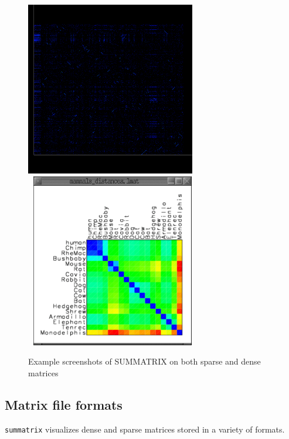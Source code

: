 \documentclass[12pt]{article}
\newcommand{\code}[1]{{\tt #1}}
\begin{document}
\begin{figure}
\begin{center}
\includegraphics[height=3in]{figures/summatrix.pdf}
\includegraphics[width=3in,height=3in]{figures/summatrix-mammals.pdf}
\end{center}
\caption{Example screenshots of SUMMATRIX on both sparse and dense matrices}
\label{fig:summatrix}
\end{figure}


\subsection{Matrix file formats}

\code{summatrix} visualizes dense and sparse matrices stored in a variety of 
formats.
\end{document}
